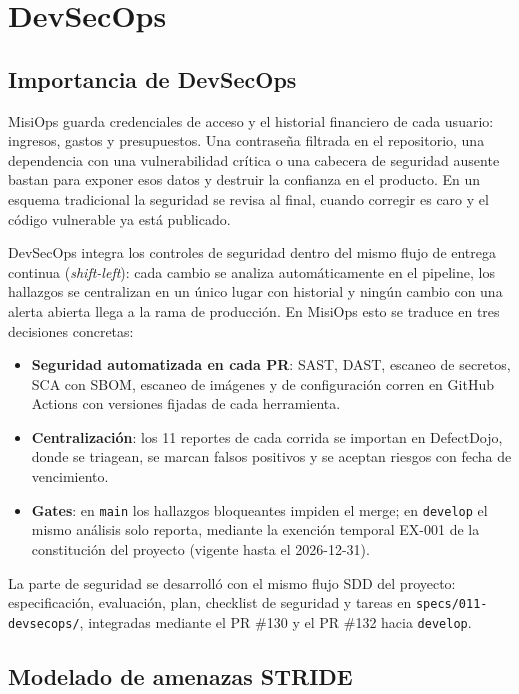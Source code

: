 \section{DevSecOps}

\subsection{Importancia de DevSecOps}

MisiOps guarda credenciales de acceso y el historial financiero de cada usuario: ingresos, gastos y presupuestos. Una contraseña filtrada en el repositorio, una dependencia con una vulnerabilidad crítica o una cabecera de seguridad ausente bastan para exponer esos datos y destruir la confianza en el producto. En un esquema tradicional la seguridad se revisa al final, cuando corregir es caro y el código vulnerable ya está publicado.

DevSecOps integra los controles de seguridad dentro del mismo flujo de entrega continua (\textit{shift-left}): cada cambio se analiza automáticamente en el pipeline, los hallazgos se centralizan en un único lugar con historial y ningún cambio con una alerta abierta llega a la rama de producción. En MisiOps esto se traduce en tres decisiones concretas:

\begin{itemize}
    \item \textbf{Seguridad automatizada en cada PR}: SAST, DAST, escaneo de secretos, SCA con SBOM, escaneo de imágenes y de configuración corren en GitHub Actions con versiones fijadas de cada herramienta.
    \item \textbf{Centralización}: los 11 reportes de cada corrida se importan en DefectDojo, donde se triagean, se marcan falsos positivos y se aceptan riesgos con fecha de vencimiento.
    \item \textbf{Gates}: en \texttt{main} los hallazgos bloqueantes impiden el merge; en \texttt{develop} el mismo análisis solo reporta, mediante la exención temporal EX-001 de la constitución del proyecto (vigente hasta el 2026-12-31).
\end{itemize}

La parte de seguridad se desarrolló con el mismo flujo SDD del proyecto: especificación, evaluación, plan, checklist de seguridad y tareas en \texttt{specs/011-devsecops/}, integradas mediante el PR \#130 y el PR \#132 hacia \texttt{develop}.

\subsection{Modelado de amenazas STRIDE}

